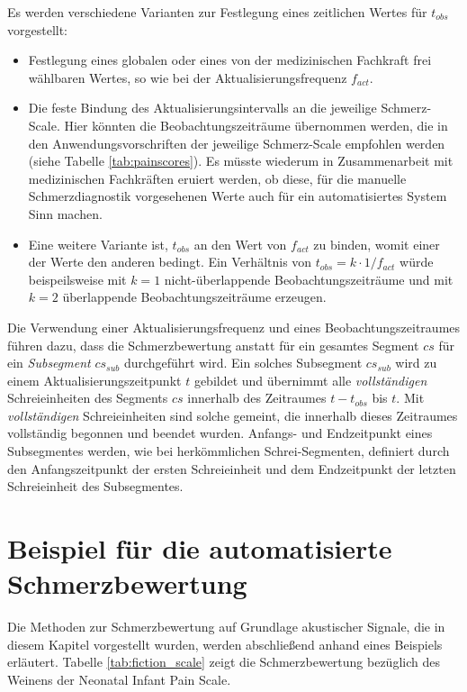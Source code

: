 Es werden verschiedene Varianten zur Festlegung eines zeitlichen Wertes für $t_{obs}$ vorgestellt:
\begin{itemize}
\item Festlegung eines globalen oder eines von der medizinischen Fachkraft frei wählbaren Wertes, so wie bei der Aktualisierungsfrequenz $f_{act}$.
\item Die feste Bindung des Aktualisierungsintervalls an die jeweilige Schmerz-Scale. Hier könnten die Beobachtungszeiträume übernommen werden, die in den Anwendungsvorschriften der jeweilige Schmerz-Scale empfohlen werden (siehe Tabelle \ref{tab:painscores}). Es müsste wiederum in Zusammenarbeit mit medizinischen Fachkräften eruiert werden, ob diese, für die manuelle Schmerzdiagnostik vorgesehenen Werte auch für ein automatisiertes System Sinn machen.
\item Eine weitere Variante ist, $t_{obs}$ an den Wert von $f_{act}$ zu binden, womit einer der Werte den anderen bedingt. Ein Verhältnis von $t_{obs} = k \cdot 1/f_{act}$ würde beispeilsweise mit $k=1$ nicht-überlappende Beobachtungszeiträume und  mit $k=2$ überlappende Beobachtungszeiträume erzeugen.
\end{itemize}

Die Verwendung einer Aktualisierungsfrequenz und eines Beobachtungszeitraumes führen dazu, dass die Schmerzbewertung anstatt für ein gesamtes Segment $cs$ für ein \emph{Subsegment} $cs_{sub}$ durchgeführt wird. Ein solches Subsegment $cs_{sub}$ wird zu einem Aktualisierungszeitpunkt $t$ gebildet und übernimmt alle \emph{vollständigen} Schreieinheiten des Segments $cs$ innerhalb des Zeitraumes $t - t_{obs}$ bis $t$. Mit \emph{vollständigen} Schreieinheiten sind solche gemeint, die innerhalb dieses Zeitraumes vollständig begonnen und beendet wurden. Anfangs- und Endzeitpunkt eines Subsegmentes werden, wie bei herkömmlichen Schrei-Segmenten, definiert durch den Anfangszeitpunkt der ersten Schreieinheit und dem Endzeitpunkt der letzten Schreieinheit des Subsegmentes. 

\vspace{5mm}

\section{Beispiel für die automatisierte Schmerzbewertung}

Die Methoden zur Schmerzbewertung auf Grundlage akustischer Signale, die in diesem Kapitel vorgestellt wurden, werden abschließend anhand eines Beispiels erläutert. Tabelle \ref{tab:fiction_scale} zeigt die Schmerzbewertung bezüglich des Weinens der \glqq Neonatal Infant Pain Scale\grqq{}.

